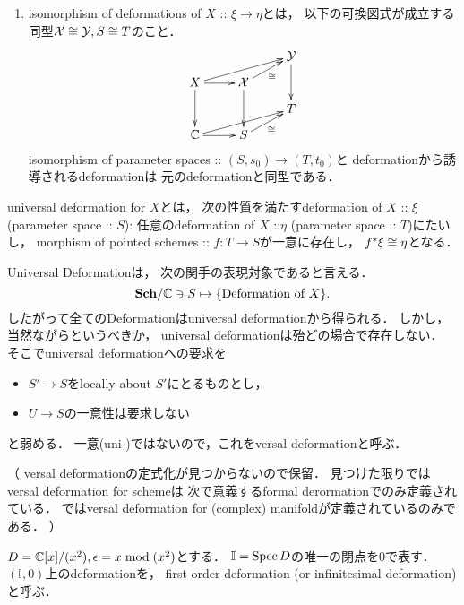 \documentclass[a4paper]{jsarticle}
\newcommand{\dualnum}{\mathbb{I}}
\newcommand{\famX}{\mathcal{X}}
\newcommand{\famY}{\mathcal{Y}}
\begin{document}
\begin{Def}
\begin{enumerate}[label=(\roman*), leftmargin=*]
    \item
        isomorphism of deformations of $X$ :: $\xi \to \eta$とは，
        以下の可換図式が成立する同型$\famX \iso \famY, S \iso T$のこと．
        \[\xymatrix@R=8pt{
                {} & {} & \famY \ar[dd]\\
            X \ar[r]\ar[dd]\ar[rru]& \famX \ar[dd]\ar[ru]_-{\iso}& {} \\
            {} & {} & T \\
            \C \ar[r]\ar[rru]& S \ar[ru]_-{\iso}& {}
        }\]
        isomorphism of parameter spaces :: $(S, s_0) \to (T, t_0)$と
        deformationから誘導されるdeformationは
        元のdeformationと同型である．
    \end{enumerate}
    \end{Def}

    \begin{Def}
        universal deformation for $X$とは，
        次の性質を満たすdeformation of $X$ :: $\xi$ (parameter space :: $S$):
        任意のdeformation of $X$ ::$\eta$ (parameter space :: $T$)にたいし，
        morphism of pointed schemes :: $f: T \to S$が一意に存在し，
        $f^* \xi \cong \eta$となる．
    \end{Def}
    Universal Deformationは，
    次の関手の表現対象であると言える．
    \[ \mathbf{Sch}/\mathbb{C} \ni S \mapsto \{ \text{Deformation of $X$} \}. \]
    したがって全てのDeformationはuniversal deformationから得られる．
    しかし，当然ながらというべきか，
    universal deformationは殆どの場合で存在しない．
    そこでuniversal deformationへの要求を
    \begin{itemize}
        \item $S' \to S$をlocally about $S'$にとるものとし，
        \item $U \to S$の一意性は要求しない
    \end{itemize}
    と弱める．
    一意(uni-)ではないので，これをversal deformationと呼ぶ．

    \begin{Def}
        （
        versal deformationの定式化が見つからないので保留．
        見つけた限りではversal deformation for schemeは
        次で意義するformal derormationでのみ定義されている．
        \cite{GACII}ではversal deformation for (complex) manifoldが定義されているのみである．
        ）
    \end{Def}

    \begin{Def}
        $D=\mathbb{C}[x]/(x^2), \epsilon=x \bmod (x^2)$とする．
        $\dualnum=\Spec D$の唯一の閉点を$0$で表す．
        $(\dualnum, 0)$上のdeformationを，
        first order deformation (or infinitesimal deformation)と呼ぶ．
    \end{Def}
\end{document}
